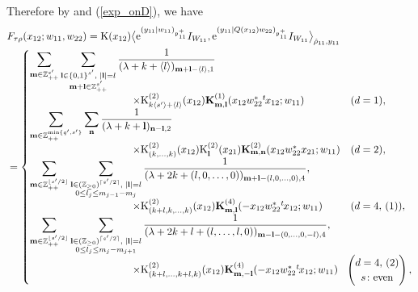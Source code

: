 \documentclass[pdftex]{sigma}
\numberwithin{equation}{section}
\newcommand{\ds}{\displaystyle}
\newcommand{\bK}{\mathbf{K}}
\newcommand{\bl}{\mathbf{l}}
\newcommand{\bm}{\mathbf{m}}
\newcommand{\bn}{\mathbf{n}}
\newcommand{\BZ}{\mathbb{Z}}
\newcommand{\fp}{\mathfrak{p}}
\newcommand{\rK}{\mathrm{K}}
\begin{document}
Therefore by \cite{N2} and (\ref{exp_onD}), we have
\begin{align*}
&F_{\tau\rho}(x_{12};w_{11},w_{22})=\rK(x_{12})\bigl\langle {\rm e}^{(y_{11}|w_{11})_{\fp^+_{11}}}I_{W_{11}},
{\rm e}^{(y_{11}|Q(x_{12})w_{22})_{\fp^+_{11}}}I_{W_{11}}\bigr\rangle_{\hat{\rho}_{11},y_{11}}\\
&=\begin{cases}
\ds \sum_{\bm\in\BZ_{++}^{s'}}\sum_{\substack{\bl\in\{0,1\}^{s'},\; |\bl|=l\\ \bm+\bl\in\BZ_{++}^{s'}}}
\frac{1}{(\lambda+k+\langle l\rangle)_{\bm+\bl-\langle l\rangle,1}}\\
\hspace{100pt}\times \rK_{k\langle s'\rangle+\langle l\rangle}^{(2)}(x_{12})
\bK_{\bm,\bl}^{(1)}(x_{12}w_{22}^*{}^t\hspace{-1pt}x_{12};w_{11}) & (d=1), \\
\ds \sum_{\bm\in\BZ_{++}^{\min\{q',s'\}}}\sum_\bn \frac{1}{(\lambda+k+\bl)_{\bn-\bl,2}}\\
\hspace{100pt}\times \rK_{(k,\ldots,k)}^{(2)}(x_{12})\rK_\bl^{(2)}(x_{21})\bK_{\bm,\bn}^{(2)}(x_{12}w_{22}^*x_{21};w_{11}) & (d=2), \\
\ds \sum_{\bm\in\BZ_{++}^{\lfloor s'/2\rfloor}}
\sum_{\substack{\bl\in(\BZ_{\ge 0})^{\lceil s'/2\rceil},\; |\bl|=l\\ 0\le l_j\le m_{j-1}-m_j}}
\frac{1}{(\lambda+2k+(l,0,\ldots,0))_{\bm+\bl-(l,0,\ldots,0),4}},\\
\hspace{100pt}\times \rK_{(k+l,k,\ldots,k)}^{(2)}(x_{12})
\bK_{\bm,\bl}^{(4)}(-x_{12}w_{22}^*{}^t\hspace{-1pt}x_{12};w_{11}) & (d=4,\,(1)),\\
\ds \sum_{\bm\in\BZ_{++}^{\lfloor s'/2\rfloor}}
\sum_{\substack{\bl\in(\BZ_{\ge 0})^{\lceil s'/2\rceil},\; |\bl|=l\\ 0\le l_j\le m_j-m_{j+1}}}
\frac{1}{(\lambda+2k+l+(l,\ldots,l,0))_{\bm-\bl-(0,\ldots,0,-l),4}},\\
\hspace{100pt}\times \rK_{(k+l,\ldots,k+l,k)}^{(2)}(x_{12})
\bK_{\bm,-\bl}^{(4)}(-x_{12}w_{22}^*{}^t\hspace{-1pt}x_{12};w_{11})
& \!\!\begin{pmatrix}d=4,\,(2)\\s\colon \text{even}\end{pmatrix},
\end{cases}\\

\end{align*}
\end{document}
